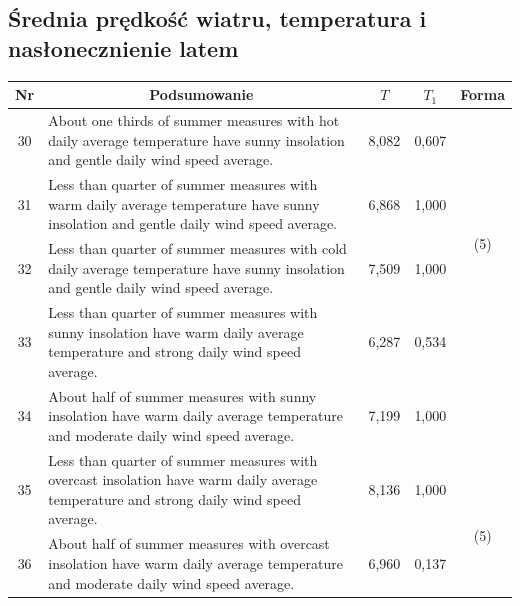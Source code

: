 \documentclass{classrep}
\begin{document}
\clearpage

\subsection{Średnia prędkość wiatru, temperatura i nasłonecznienie latem}

\begin{table}[H]
\begin{center}
\begin{tabularx}{\linewidth}{ |c|X|c|c|c| } 
\hline
Nr & \multicolumn{1}{|c|}{Podsumowanie} & $T$ & $T_1$ & Forma \\
\hline
30	&	About one thirds of summer measures with hot daily average temperature have sunny insolation and gentle daily wind speed average.	&	8,082	&	0,607& \multirow{3}{1em}{\newline\newline\newline\newline(5)} \\ \cline{1-4}	
31	&	Less than quarter of summer measures with warm daily average temperature have sunny insolation and gentle daily wind speed average.	&	6,868	&	1,000	& \\	\cline{1-4}
32	&	Less than quarter of summer measures with cold daily average temperature have sunny insolation and gentle daily wind speed average.	&	7,509 &	1,000	& \\	\hline\hline
33	&	Less than quarter of summer measures with sunny insolation have warm daily average temperature and strong daily wind speed average.	&	6,287	&	0,534	& \multirow{6}{1em}{\newline\newline\newline\newline\newline\newline\newline\newline\newline(5)} \\	\cline{1-4}
34	&	About half of summer measures with sunny insolation have warm daily average temperature and moderate daily wind speed average.	&	7,199	&	1,000	& \\	\cline{1-4}
35	&	Less than quarter of summer measures with overcast insolation have warm daily average temperature and strong daily wind speed average.	&	8,136	&	1,000	& \\	\cline{1-4}
36	&	About half of summer measures with overcast insolation have warm daily average temperature and moderate daily wind speed average.	&	6,960	&	0,137	& \\	\cline{1-4}

\end{tabularx}
\end{center}
\end{table}
\end{document}
